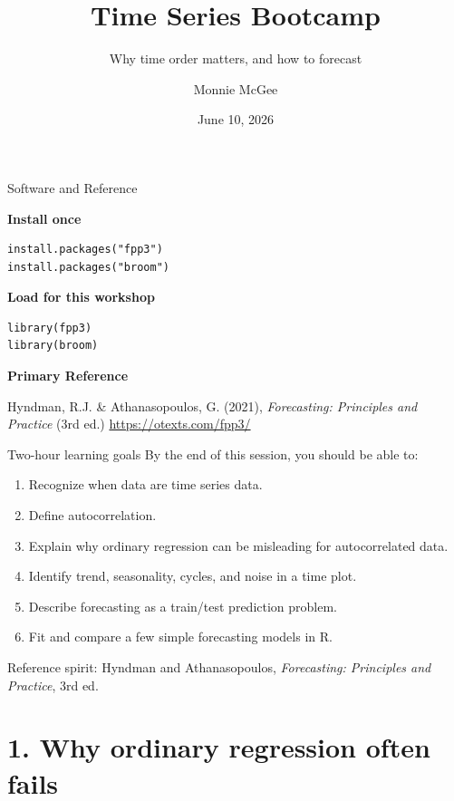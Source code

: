\documentclass[aspectratio=169,11pt]{beamer}
\title{Time Series Bootcamp}
\subtitle{Why time order matters, and how to forecast}
\author{Monnie McGee}
\institute{REU Bootcamp}
\date{June 10, 2026}
\begin{document}
\maketitle

\begin{frame}[fragile]{Software and Reference}

\textbf{Install once}

\begin{verbatim}
install.packages("fpp3")
install.packages("broom")
\end{verbatim}

\bigskip

\textbf{Load for this workshop}

\begin{verbatim}
library(fpp3)
library(broom)
\end{verbatim}

\bigskip

\textbf{Primary Reference}

Hyndman, R.J. \& Athanasopoulos, G. (2021), \emph{Forecasting: Principles and Practice} (3rd ed.)
\url{https://otexts.com/fpp3/}

\end{frame}

\begin{frame}{Two-hour learning goals}
By the end of this session, you should be able to:
\begin{enumerate}
  \item Recognize when data are time series data.
  \item Define autocorrelation.
  \item Explain why ordinary regression can be misleading for autocorrelated data.
  \item Identify trend, seasonality, cycles, and noise in a time plot.
  \item Describe forecasting as a train/test prediction problem.
  \item Fit and compare a few simple forecasting models in R.
\end{enumerate}

\vspace{0.4cm}
Reference spirit: Hyndman and Athanasopoulos, \emph{Forecasting: Principles and Practice}, 3rd ed.
\end{frame}

\section{1. Why ordinary regression often fails}
\end{document}
